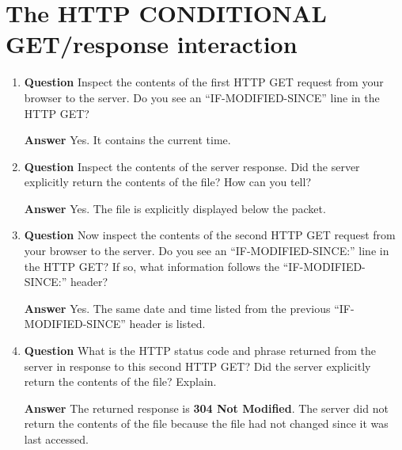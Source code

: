 \documentclass[12pt,letterpaper]{article}
\newcommand{\q}{\textbf{Question} }
\newcommand{\ans}{\textbf{Answer} }
\begin{document}
\section{The HTTP CONDITIONAL GET/response interaction}
\begin{enumerate}[resume]
\item \q Inspect the contents of the first HTTP GET request from your browser
    to the server.  Do you see an ``IF-MODIFIED-SINCE'' line in the HTTP GET? 

\ans Yes. It contains the current time.

\item \q Inspect the contents of the server response. Did the server explicitly
    return the contents of the file? How can you tell? 

\ans Yes. The file is explicitly displayed below the packet.

\item \q Now inspect the contents of the second HTTP GET request from your
    browser to the server.  Do you see an ``IF-MODIFIED-SINCE:'' line in the
    HTTP GET? If so, what information follows the ``IF-MODIFIED-SINCE:''
    header? 

\ans Yes. The same date and time listed from the previous ``IF-MODIFIED-SINCE''
    header is listed.

\item \q What is the HTTP status code and phrase returned from the server in
    response to this second HTTP GET?  Did the server explicitly return the
    contents of the file? Explain.

\ans The returned response is \textbf{304 Not Modified}. The server did not
    return the contents of the file because the file had not changed since it
    was last accessed.
\end{enumerate}


\pagebreak
\pagebreak
\pagebreak
\pagebreak
\pagebreak
\end{document}
